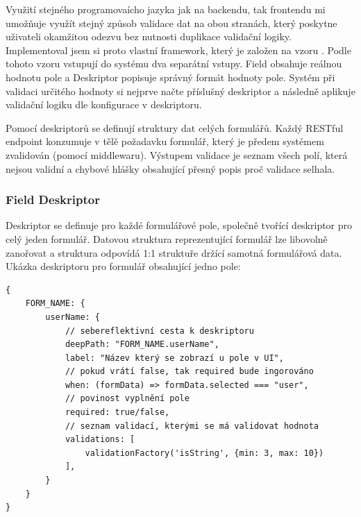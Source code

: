 Využití stejného programovaícho jazyka jak na backendu, tak frontendu mi umožňuje využít stejný způsob validace dat na obou stranách, který poskytne uživateli okamžitou odezvu bez nutnosti duplikace validační logiky. Implementoval jsem si proto vlastní framework, který je založen na vzoru . Podle tohoto vzoru vstupují do systému dva separátní vstupy. Field obsahuje reálnou hodnotu pole a Deskriptor popisuje správný formát hodnoty pole. Systém při validaci určitého hodnoty si nejprve načte příslušný deskriptor a následně aplikuje validační logiku dle konfigurace v deskriptoru.

Pomocí deskriptorů se definují struktury dat celých formulářů. Každý RESTful endpoint konzumuje v tělě požadavku formulář, který je předem systémem zvalidován (pomocí middlewaru). Výstupem validace je seznam všech polí, která nejsou validní a chybové hlášky obsahující přesný popis proč validace selhala.

\subsubsection{Field Deskriptor}
Deskriptor se definuje pro každé formulářové pole, společně tvořící deskriptor pro celý jeden formulář. Datovou struktura reprezentující formulář lze libovolně zanořovat a struktura odpovídá 1:1 struktuře držící samotná formulářová data. Ukázka deskriptoru pro formulář obsahující jedno pole:

\begin{verbatim}
{
    FORM_NAME: {
        userName: {
            // sebereflektivní cesta k deskriptoru
            deepPath: "FORM_NAME.userName",        
            label: "Název který se zobrazí u pole v UI",
            // pokud vrátí false, tak required bude ingorováno
            when: (formData) => formData.selected === "user", 
            // povinost vyplnění pole 
            required: true/false,
            // seznam validací, kterými se má validovat hodnota
            validations: [
                validationFactory('isString', {min: 3, max: 10})
            ],   
        }
    }
}
\end{verbatim}


